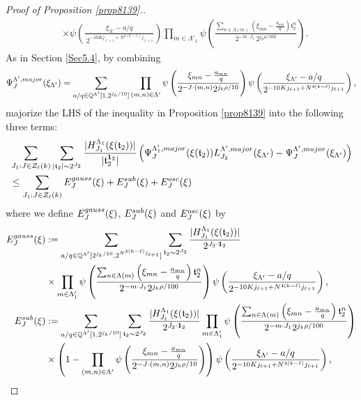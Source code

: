 \documentclass[10pt,a4paper]{amsart}
\numberwithin{equation}{section}
\begin{document}
\begin{proof}[Proof of Proposition \ref{prop8139}.]
\begin{align*}
&\times \psi\!\left(
\frac{\xi_{\Lambda'}-a/q}{\,2^{-10K j_{\ell+1}+ N^{4(k-\ell)}j_{\ell+1}}}
\right)
\prod_{m\in \Lambda'_1}
\psi\!\left(
\frac{
\sum_{n\in\Lambda(m)}
\left( \xi_{mn}-\frac{a_{mn}}{q}\right)
\mathfrak{t}_2^{n}
}{
2^{-m\cdot J_1}\,2^{j_k\rho/100}
}
\right).
\end{align*}
As in Section \ref{Sec5.4},  by combining
$$
\Psi^{\Lambda',\rm{major}}_{J}(\xi_{\Lambda'})=\sum_{ a/q\in \mathbb{Q}^{\Lambda'}[1,2^{j_k/10}]} \prod_{(m,n)\in \Lambda'} \psi\left(  \frac{  \xi_{mn}-\frac{a_{mn}}{q}}{2^{-J\cdot (m,n)}2^{j_k\rho/10}} \right)\psi\left(\frac{\xi_{\Lambda'}-a/q}{2^{-10Kj_{\ell+1}+N^{4(k-\ell)}j_{\ell+1} }}\right) ,$$    majorize the LHS of the inequality in Proposition \ref{prop8139} into the following three terms:
\begin{align*}
	&\sum_{J_1: J\in Z_{\ell}(k)}  \sum_{|\mathfrak{t}_2|\sim 2^{J_2}}    \frac{|H^{\Lambda_1}_{J_1}(\xi(\mathfrak{t}_2))|}{|\mathfrak{t}_2^{{\bf 1}_2}|}  \left(\Psi^{\Lambda_1',\rm{major}}_{J}(\xi(\mathfrak{t}_2))L^{\Lambda',\rm{major}}_{J_2}(\xi_{\Lambda'})-\Psi^{\Lambda',\rm{major}}_{J}(\xi_{\Lambda'})\right) \\
	&\le \sum_{J_1: J\in Z_{\ell}(k)} E_J^{\rm{gauss}}(\xi)+E_J^{\rm{sub}}(\xi) +E_J^{\rm{osc}}(\xi) 
\end{align*}
where     we define $E_J^{\rm{gauss}}(\xi)$, $E_J^{\rm{sub}}(\xi)$ and $E_J^{\rm{osc}}(\xi)$ by 
\begin{align*}
	E^{\rm{gauss}}_J(\xi)&:= \sum_{ a/q\in \mathbb{Q}^{\Lambda'}[2^{j_k/10},2^{N^{4(k-\ell)} j_{\ell+1} }]}  \sum_{\mathfrak{t}_2\sim  2^{J_2}}    \frac{|H^{\Lambda_{1}}_{J_1}(\xi(\mathfrak{t}_2))|}{2^{J_2\cdot {\bf 1}_2}} \nonumber  \\
	&  \times \prod_{m\in\Lambda'_{1}}\psi\left( \frac{\sum_{n\in\Lambda(m)}\left( \xi_{mn}-\frac{a_{mn}}{q} \right)\mathfrak{t}_2^n }{2^{-m\cdot J_1} 2^{ j_k\rho/100}} \right)\psi\left(\frac{\xi_{\Lambda'}-a/q}{2^{-10Kj_{\ell+1}+N^{4(k-\ell)}j_{\ell+1}}}\right),\nonumber\\
	E^{\rm{sub}}_J(\xi)&:=  \sum_{ a/q\in \mathbb{Q}^{\Lambda'}[1,2^{j_k/10}]}   \sum_{\mathfrak{t}_2\sim  2^{J_2}}    \frac{|H^{\Lambda_{1}}_{J_1}(\xi(\mathfrak{t}_2))|}{2^{J_2\cdot {\bf 1}_2}}  \prod_{m\in\Lambda'_{1}}\psi\left( \frac{\sum_{n\in\Lambda(m)}\left( \xi_{mn}-\frac{a_{mn}}{q} \right)\mathfrak{t}_2^n }{2^{-m\cdot J_1} 2^{ j_k\rho/100}} \right)
	\nonumber \\
	&\times   \left(1-\prod_{(m,n)\in\Lambda'}\psi\left(  \frac{  \xi_{mn}-\frac{a_{mn}}{q}}{ 2^{-J\cdot (m,n)}2^{j_k\rho/10}} \right)\right)\psi\left(\frac{\xi_{\Lambda'}-a/q}{2^{-10Kj_{\ell+1}+N^{4(k-\ell)}j_{\ell+1} }}\right),\\

\end{align*}
\end{proof}
\end{document}
